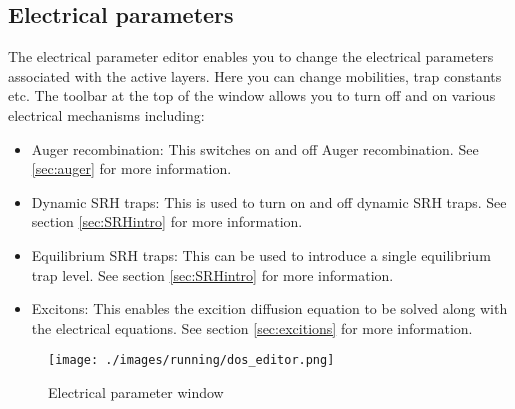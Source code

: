 
\newpage
\subsection{Electrical parameters}
\label{sec:doseditor}
The electrical parameter editor enables you to change the electrical parameters associated with the active layers. Here you can change mobilities, trap constants etc.  The toolbar at the top of the window allows you to turn off and on various electrical mechanisms including:

\begin{itemize}
  \item Auger recombination: This switches on and off Auger recombination. See \ref{sec:auger} for more information.
  \item Dynamic SRH traps: This is used to turn on and off dynamic SRH traps.  See section \ref{sec:SRHintro} for more information.
  \item Equilibrium SRH traps: This can be used to introduce a single equilibrium trap level.  See section \ref{sec:SRHintro} for more information.
  \item Excitons: This enables the excition diffusion equation to be solved along with the electrical equations. See section \ref{sec:excitions} for more information.
\end{itemize}

\begin{figure}[H]
\centering
\texttt{[image: ./images/running/dos\_editor.png]}
\caption{Electrical parameter window}
\label{fig:electricalparamwindow}
\end{figure}

\\

